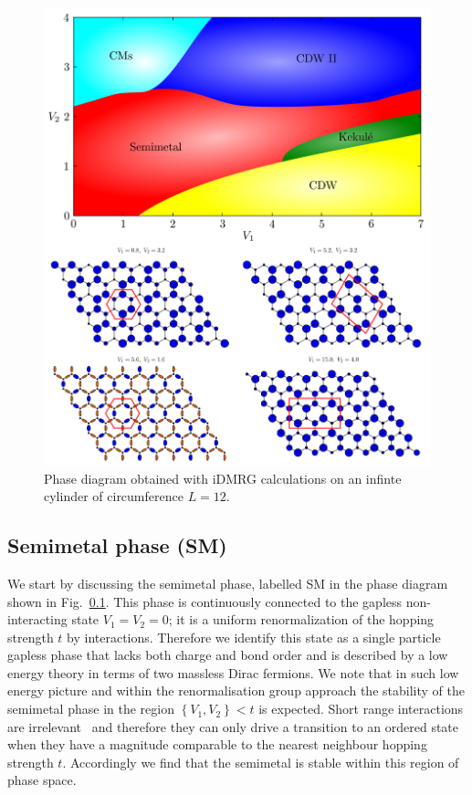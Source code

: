 \documentclass[aps,prx,10pt,twocolumn,floatfix,superscriptaddress,showpacs,numerical,footinbib]{revtex4-1}
\begin{document}
\begin{figure}
 \includegraphics[width=\columnwidth]{pdf/phase_diagram.pdf}
 \caption{Phase diagram obtained with iDMRG calculations on an infinte cylinder of circumference $L=12$. \label{fig:phase diagram}}
\end{figure}

%
\subsection{Semimetal phase (SM)}
%
We start by discussing the semimetal phase, labelled SM in the phase diagram shown in Fig.~\ref{}.
%
This phase is continuously connected to the gapless non-interacting state $V_{1}=V_{2}=0$; 
it is a uniform renormalization of the hopping strength $t$ by interactions.
%
Therefore we identify this state as a single particle gapless phase that lacks both charge and bond order and is described by a low energy theory in terms of two massless Dirac fermions.
%
We note that in such low energy picture and within the renormalisation group approach the stability of the semimetal phase in the region $\left\lbrace V_{1},V_{2}\right\rbrace < t$ is expected.
%
Short range interactions are irrelevant~\cite{Shankar?} and therefore they can only drive a transition to an ordered state when they have a magnitude comparable to the nearest neighbour hopping strength $t$.
%
Accordingly we find that the semimetal is stable within this region of phase space.
\end{document}
